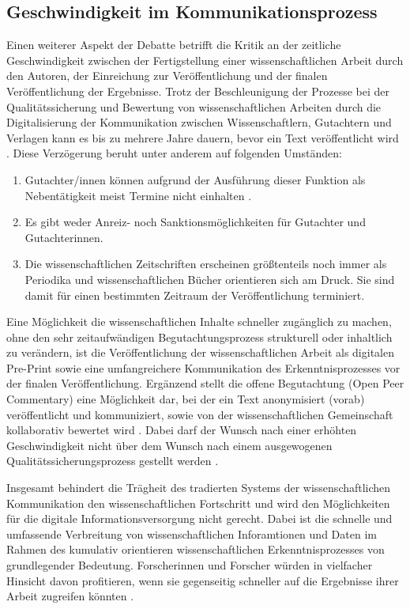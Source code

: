 \subsection{Geschwindigkeit im Kommunikationsprozess}

Einen weiterer Aspekt der Debatte betrifft die Kritik an der zeitliche Geschwindigkeit zwischen der Fertigstellung einer wissenschaftlichen Arbeit durch den Autoren, der Einreichung zur Veröffentlichung und der finalen Veröffentlichung der Ergebnisse. Trotz der Beschleunigung der Prozesse bei der Qualitätssicherung und Bewertung von wissenschaftlichen Arbeiten durch die Digitalisierung der Kommunikation zwischen Wissenschaftlern, Gutachtern und Verlagen kann es bis zu mehrere Jahre dauern, bevor ein Text veröffentlicht wird \cite{nosek_2012_scientific}. Diese Verzögerung beruht unter anderem auf folgenden Umständen:

\begin{enumerate}
\item Gutachter/innen können aufgrund der Ausführung dieser Funktion als Nebentätigkeit meist Termine nicht einhalten \cite{bar_2009_wissenschaftliche}.
\item Es gibt weder Anreiz- noch Sanktionsmöglichkeiten für Gutachter und Gutachterinnen.
\item Die wissenschaftlichen Zeitschriften erscheinen größtenteils noch immer als Periodika und wissenschaftlichen Bücher orientieren sich am Druck. Sie sind damit für einen bestimmten Zeitraum der Veröffentlichung terminiert.
\end{enumerate}

Eine Möglichkeit die wissenschaftlichen Inhalte schneller zugänglich zu machen, ohne den sehr zeitaufwändigen Begutachtungsprozess strukturell oder inhaltlich zu verändern, ist die Veröffentlichung der wissenschaftlichen Arbeit als digitalen Pre-Print sowie eine umfangreichere Kommunikation des Erkenntnisprozesses vor der finalen Veröffentlichung. Ergänzend stellt die offene Begutachtung (Open Peer Commentary) eine Möglichkeit dar, bei der ein Text anonymisiert (vorab) veröffentlicht und kommuniziert, sowie von der wissenschaftlichen Gemeinschaft kollaborativ bewertet wird \cite{mueller_2009_peerreview}. Dabei darf der Wunsch nach einer erhöhten Geschwindigkeit nicht über dem Wunsch nach einem ausgewogenen Qualitätssicherungsprozess gestellt werden \cite{Beall_2012}.

Insgesamt behindert die Trägheit des tradierten Systems der wissenschaftlichen Kommunikation den wissenschaftlichen Fortschritt und wird den Möglichkeiten für die digitale Informationsversorgung nicht gerecht. Dabei ist die schnelle und umfassende Verbreitung von wissenschaftlichen Inforamtionen und Daten im Rahmen des kumulativ orientieren wissenschaftlichen Erkenntnisprozesses von grundlegender Bedeutung. Forscherinnen und Forscher würden in vielfacher Hinsicht davon profitieren, wenn sie gegenseitig schneller auf die Ergebnisse ihrer Arbeit zugreifen könnten \cite{nosek_2012_scientific} \cite{winkler_2011_anforderungen}.

